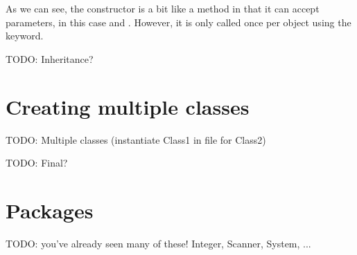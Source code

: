 As we can see, the  constructor is a bit like a method in that it can accept parameters, in this case  and . However, it is only called once per object using the  keyword.

TODO: Inheritance?

\section{Creating multiple classes}

TODO: Multiple classes (instantiate Class1 in file for Class2)
    
TODO: Final?

\section{Packages}

TODO: you've already seen many of these! Integer, Scanner, System, ...
